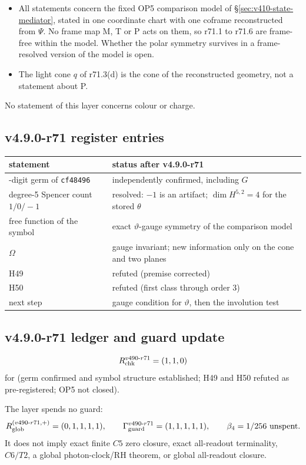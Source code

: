 \begin{itemize}[leftmargin=2em]
\item All statements concern the fixed OP5 comparison model of \S\ref{sec:v410-state-mediator}, stated in one coordinate chart
with one coframe reconstructed from \(\Psi\).  No frame map M, T or P acts on them, so r71.1 to r71.6 are frame-free within the
model.  Whether the polar symmetry survives in a frame-resolved version of the model is open.
\item The light cone \(q\) of r71.3(d) is the cone of the reconstructed geometry, not a statement about P.
\end{itemize}
No statement of this layer concerns colour or charge.

\subsection*{v4.9.0-r71 register entries}
\label{subsec:v490-r71-register}

\begin{center}
\small
\begin{tabular}{@{}>{\raggedright\arraybackslash}p{}>{\raggedright\arraybackslash}p{}@{}}
\toprule
statement & status after v4.9.0-r71\\
\midrule
70-digit germ of \texttt{cf48496} & independently confirmed, including \(G\)\\
degree-5 Spencer count \(1/0/-1\) & resolved: \(-1\) is an artifact; \(\dim H^{5,2}=4\) for the stored \(\theta\)\\
free function of the symbol & exact \(\vartheta\)-gauge symmetry of the comparison model\\
\(\Omega\) & gauge invariant; new information only on the cone and two planes\\
H49 & refuted (premise corrected)\\
H50 & refuted (first class through order 3)\\
next step & gauge condition for \(\vartheta\), then the involution test\\
\bottomrule
\end{tabular}
\end{center}

\subsection*{v4.9.0-r71 ledger and guard update}
\label{subsec:v490-r71-ledger-guard}

\[
R_{\rm chk}^{v490\text{-}r71}=(1,1,0)
\]
for (germ confirmed and symbol structure established; H49 and H50 refuted as pre-registered; OP5 not closed).

The layer spends no guard:
\[
R_{\rm glob}^{(v490\text{-}r71,+)}=(0,1,1,1,1),
\qquad
\Gamma_{\rm guard}^{v490\text{-}r71}=(1,1,1,1,1),
\qquad
\beta_4=1/256\ \text{unspent}.
\]
It does not imply exact finite \(C5\) zero closure, exact all-readout terminality,
\(C6/T2\), a global photon-clock/RH theorem, or global all-readout closure.
